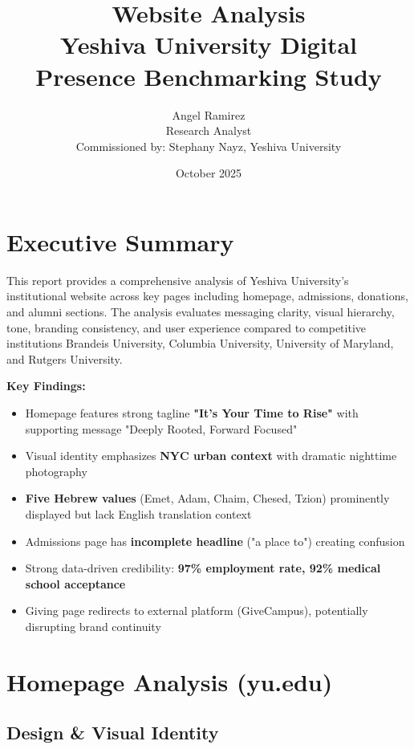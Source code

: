\documentclass[12pt,letterpaper]{article}
\title{\textbf{Website Analysis}\\
\large Yeshiva University Digital Presence Benchmarking Study}
\author{Angel Ramirez\\
\small Research Analyst\\
\small Commissioned by: Stephany Nayz, Yeshiva University}
\date{October 2025}
\begin{document}
\maketitle

\section*{Executive Summary}

This report provides a comprehensive analysis of Yeshiva University's institutional website across key pages including homepage, admissions, donations, and alumni sections. The analysis evaluates messaging clarity, visual hierarchy, tone, branding consistency, and user experience compared to competitive institutions Brandeis University, Columbia University, University of Maryland, and Rutgers University.

\textbf{Key Findings:}
\begin{itemize}[leftmargin=*]
    \item Homepage features strong tagline \textbf{"It's Your Time to Rise"} with supporting message "Deeply Rooted, Forward Focused"
    \item Visual identity emphasizes \textbf{NYC urban context} with dramatic nighttime photography
    \item \textbf{Five Hebrew values} (Emet, Adam, Chaim, Chesed, Tzion) prominently displayed but lack English translation context
    \item Admissions page has \textbf{incomplete headline} ("a place to") creating confusion
    \item Strong data-driven credibility: \textbf{97\% employment rate, 92\% medical school acceptance}
    \item Giving page redirects to external platform (GiveCampus), potentially disrupting brand continuity
\end{itemize}

\section{Homepage Analysis (yu.edu)}

\subsection{Design \& Visual Identity}
\end{document}

